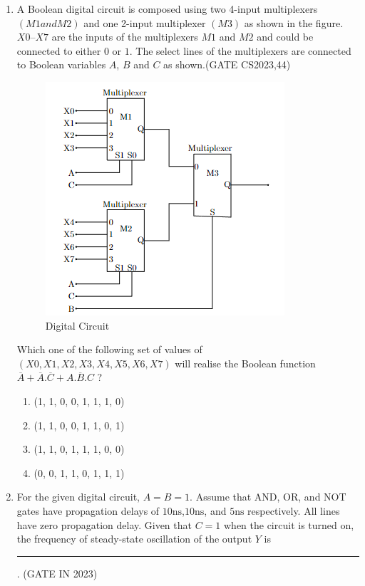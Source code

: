 \begin{enumerate}
\item A Boolean digital circuit is composed using two 4-input multiplexers $(M1 and M2)$ and one 2-input multiplexer $(M3)$ as shown in the figure. $X0$–$X7$ are the inputs of the multiplexers $M1$ and $M2$ and could be connected to either $0$ or $1$. The select lines of the multiplexers are connected to Boolean variables $A$, $B$ and $C$ as shown.\hfill(GATE CS2023,44)

\begin{figure}[H]
	\centering
	\includegraphics[width=\columnwidth]{figs/Multiplexer.png}
	\caption{Digital Circuit}
	\label{fig:Multiplexer}
\end{figure}

Which one of the following set of values of $(X0, X1, X2, X3, X4, X5, X6, X7)$ will realise the Boolean function
$\overline{A} + \overline{A}.\overline{C}+A.\overline{B}.C $ ?
\begin{enumerate}
	\item (1, 1, 0, 0, 1, 1, 1, 0)
	\item (1, 1, 0, 0, 1, 1, 0, 1)
	\item (1, 1, 0, 1, 1, 1, 0, 0)
	\item (0, 0, 1, 1, 0, 1, 1, 1)
\end{enumerate}
\item For the given digital circuit, $A = B = 1$. Assume that AND, OR, and NOT gates have propagation delays of $10\mathrm{ns}$,$10\mathrm{ns}$, and $5\mathrm{ns}$ respectively. All lines have zero
propagation delay. Given that $C = 1$ when the circuit is turned on, the frequency of steady-state oscillation of the output $Y$  is  \rule{30pt}{1pt}.
\hfill (GATE IN 2023)
\begin{figure}[H]
	\centering


\end{figure}
\end{enumerate}
